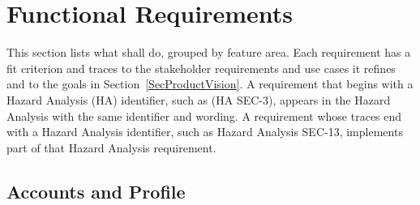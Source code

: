 \documentclass[12pt]{article}
\begin{document}
\section{Functional Requirements} \label{SecFR}


This section lists what \progname{} shall do, grouped by feature area. Each
requirement has a fit criterion and traces to the stakeholder requirements and
use cases it refines and to the goals in Section~\ref{SecProductVision}. A
requirement that begins with a Hazard Analysis (HA) identifier, such as
(HA SEC-3), appears in the Hazard Analysis with the same identifier and
wording. A requirement whose traces end with a Hazard Analysis identifier, such
as Hazard Analysis SEC-13, implements part of that Hazard Analysis
requirement.

\subsection{Accounts and Profile}
\end{document}

